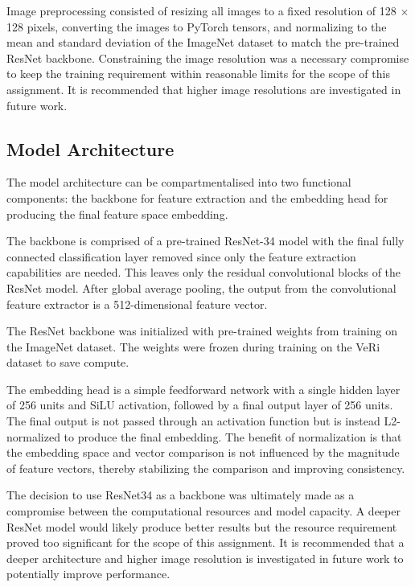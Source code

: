 \documentclass{article}
\theoremstyle{plain}
\theoremstyle{definition}
\theoremstyle{remark}
\begin{document}
Image preprocessing consisted of resizing all images to a fixed resolution of 
128 $\times$ 128 pixels, converting the images to PyTorch tensors, and 
normalizing to the mean and standard deviation of the ImageNet dataset to match 
the pre-trained ResNet backbone. Constraining the image resolution was a 
necessary compromise to keep the training requirement within reasonable limits 
for the scope of this assignment. It is recommended that higher image resolutions
are investigated in future work.

\subsection{Model Architecture}

The model architecture can be compartmentalised into two functional components: 
the backbone for feature extraction and the embedding head for producing the 
final feature space embedding. 

The backbone is comprised of a pre-trained ResNet-34 \cite{He15} model with the final 
fully connected classification layer removed since only the feature extraction 
capabilities are needed. This leaves only the residual convolutional blocks of 
the ResNet model. After global average pooling, the output from the convolutional 
feature extractor is a 512-dimensional feature vector.  

The ResNet backbone was initialized with pre-trained weights from training 
on the ImageNet dataset. The weights were frozen during training on the 
VeRi dataset to save compute. 

The embedding head is a simple feedforward network with a single hidden layer 
of 256 units and SiLU activation, followed by a final output layer of 256 units. 
The final output is not passed through an activation function but is instead 
L2-normalized to produce the final embedding. The benefit of normalization is that the 
embedding space and vector comparison is not influenced by the magnitude of 
feature vectors, thereby stabilizing the comparison and improving consistency.

The decision to use ResNet34 as a backbone was ultimately made as a compromise 
between the computational resources and model capacity. A deeper ResNet model 
would likely produce better results but the resource requirement proved too 
significant for the scope of this assignment. It is recommended that a deeper 
architecture and higher image resolution is investigated in future work to 
potentially improve performance.
\end{document}
